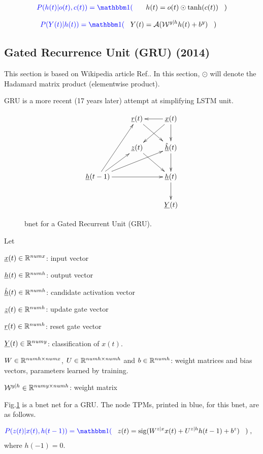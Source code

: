 \begin{align}\color{blue}
P(h(t)|o(t), c(t))=\indi(\;\;\;&&
h(t)=o(t)\odot \tanh
(c(t))
\;\;\;)
\end{align}



\begin{align}\color{blue}
P(Y(t)|h(t))=\indi(\;\;\;&
Y(t)= \cala(\calw^{y|h}h(t) + b^y)
\;\;\;)
\end{align}

\newpage
\subsection{Gated Recurrence Unit
 (GRU) (2014)}

This 
section is based 
on Wikipedia article Ref.\cite{gru}. In this section,
$\odot$
will denote the Hadamard matrix product
(elementwise product).

GRU is a more recent (17 years later)
attempt at simplifying LSTM unit.

\begin{figure}[h!]
\centering
$$\xymatrix{
&\rvr(t)\ar[dr]&\rvx(t)\ar[d]\ar[dl]\ar[l]
\\
&\rvz(t)\ar[dr]
&\hat{\rvh}(t)\ar[d]
\\
\rvh(t-1)\ar[ur]\ar[rr]\ar[urr]\ar[uur]
&&\rvh(t)\ar[d]
\\
&&\rvY(t)
}$$
\caption{bnet for a Gated
Recurrent Unit (GRU).}
\label{fig-rnn-gru}
\end{figure}

Let

${\underline{x}}(t)\in { \mathbb{R}}^{numx}$: input vector

${\underline{h}}(t)\in{ \mathbb{R}}^{numh}$: output vector

$\hat{{\underline{h}}}(t)\in{ \mathbb{R}}^{numh}$: candidate activation vector

${\underline{z}}(t)\in{ \mathbb{R}}^{numh}$: update gate vector

${\underline{r}}(t)\in{ \mathbb{R}}^{numh}$: reset gate vector

${\underline{Y}}(t)\in { \mathbb{R}}^{numy}$: 
classification of $x(t)$.

$W\in { \mathbb{R}}^{numh\times numx}$, 
$U\in { \mathbb{R}}^{numh\times numh}$
and 
$b\in { \mathbb{R}}^{numh}$: 
weight matrices and bias vectors,
 parameters learned by training.

${\cal W}^{y|h}\in { \mathbb{R}}^{numy\times numh}$:
 weight matrix

Fig.\ref{fig-rnn-gru}
is a bnet net
for a GRU.
The node TPMs, printed in blue,
for this bnet, are
as follows.


\begin{align}\color{blue}
P(z(t)|x(t),h(t-1))=\indi(\;\;\;&
z(t) = \sig(W^{z|x} x(t) + U^{z|h} h(t-1) + b^z)
\;\;\;)
\;,
\end{align}
where $h(-1)=0$.

